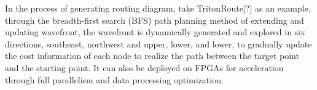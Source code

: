 In the process of generating routing diagram, take TritonRoute[?] as an example, through the breadth-first search (BFS) path planning method of extending and updating wavefront, 
the wavefront is dynamically generated and explored in six directions, southeast, northwest and upper, lower, and lower, to gradually update the cost information of each node to realize the path between the target point and the starting point.
It can also be deployed on FPGAs for acceleration through full parallelism and data processing optimization.












